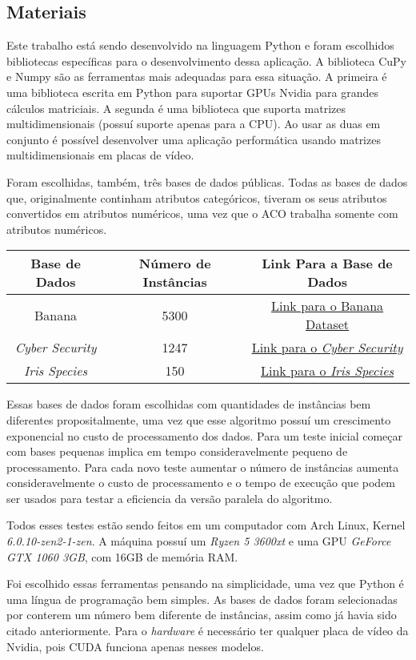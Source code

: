 \subsection{Materiais} \label{Materiais}

Este trabalho está sendo desenvolvido na linguagem Python e foram escolhidos bibliotecas 
específicas para o desenvolvimento dessa aplicação.
A biblioteca CuPy\cite{cupyLib} e Numpy\cite{numpyLib} são as ferramentas mais adequadas
para essa situação. A primeira é uma biblioteca escrita em Python para suportar GPUs Nvidia
para grandes cálculos matriciais. A segunda é uma biblioteca que suporta matrizes multidimensionais
(possuí suporte apenas para a CPU). Ao usar as duas em conjunto é possível desenvolver uma aplicação
performática usando matrizes multidimensionais em placas de vídeo.

Foram escolhidas, também, três bases de dados públicas.
Todas as bases de dados que, originalmente continham atributos categóricos, tiveram os
seus atributos convertidos em atributos numéricos, uma vez que o ACO trabalha
somente com atributos numéricos.

\begin{center}
    \begin{tabular}{|c|c|c|}   
        \hline
        Base de Dados & Número de Instâncias & Link Para a Base de Dados \\
        \hline
        Banana & 5300 & \href{https://www.kaggle.com/datasets/saranchandar/standard-classification-banana-dataset}{Link para o Banana Dataset} \\
        \hline
        \emph{Cyber Security} & 1247 & \href{https://www.kaggle.com/datasets/deepcontractor/cyber-security-salaries}{Link para o \emph{Cyber Security}} \\
        \hline
        \emph{Iris Species} & 150 & \href{https://www.kaggle.com/datasets/uciml/iris}{Link para o \emph{Iris Species}} \\
        \hline 
    \end{tabular}
\end{center}

Essas bases de dados foram escolhidas com quantidades de instâncias bem diferentes propositalmente, uma vez
que esse algoritmo possuí um crescimento exponencial no custo de processamento dos dados. Para um teste inicial
começar com bases pequenas implica em tempo consideravelmente pequeno de processamento. Para cada novo teste
aumentar o número de instâncias aumenta consideravelmente o custo de processamento e o tempo de execução que 
podem ser usados para testar a eficiencia da versão paralela do algoritmo.

Todos esses testes estão sendo feitos em um computador com Arch Linux, Kernel \emph{6.0.10-zen2-1-zen}.
A máquina possuí um \emph{Ryzen 5 3600xt} e uma GPU \emph{GeForce GTX 1060 3GB}, com 16GB de memória RAM.

Foi escolhido essas ferramentas pensando na simplicidade, uma vez que Python é uma língua de programação
bem simples. As bases de dados foram selecionadas por conterem um número bem diferente de instâncias, assim
como já havia sido citado anteriormente. Para o \emph{hardware} é necessário ter qualquer placa de vídeo da 
Nvidia, pois CUDA funciona apenas nesses modelos.
